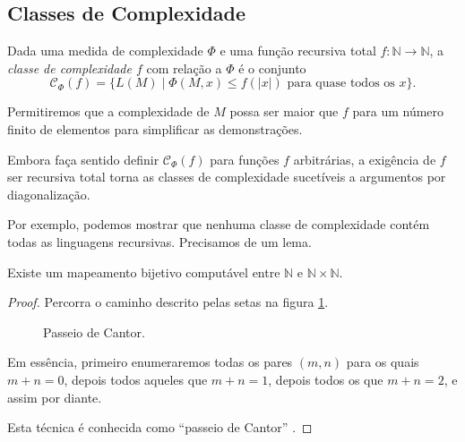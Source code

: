 \subsection{Classes de Complexidade}

\begin{definition}
    Dada uma medida de complexidade $\Phi$
    e uma função recursiva total
    $f: \mathbb N \rightarrow \mathbb N$,
    a \emph{classe de complexidade $f$} com relação a $\Phi$
    é o conjunto
    \begin{equation*}
        \mathcal C_\Phi(f) = \{ L(M) \mid \Phi(M, x) \leq f(|x|)
            \text{ para quase todos os $x$}
        \}.
    \end{equation*}
\end{definition}
Permitiremos que a complexidade de $M$
possa ser maior que $f$ para um número finito de elementos
para simplificar as demonstrações.

Embora faça sentido definir $\mathcal C_\Phi(f)$
para funções $f$ arbitrárias,
a exigência de $f$ ser recursiva total
torna as classes de complexidade
sucetíveis a argumentos por diagonalização.

Por exemplo,
podemos mostrar que
nenhuma classe de complexidade contém todas as linguagens recursivas.
Precisamos de um lema.

\begin{lemma}
    Existe um mapeamento bijetivo computável
    entre $\mathbb N$ e $\mathbb N \times \mathbb N$.
\end{lemma}

\begin{proof}
    Percorra o caminho descrito pelas setas na figura
    \ref{passeio_cantor}.

    \begin{figure}[h]
        \centering
        \caption{Passeio de Cantor.}
        \label{passeio_cantor}
    \end{figure}

    Em essência, primeiro enumeraremos todas os pares $(m, n)$
    para os quais $m + n = 0$,
    depois todos aqueles que $m + n = 1$,
    depois todos os que $m + n = 2$,
    e assim por diante.

    Esta técnica é conhecida como ``passeio de Cantor''
    \cite[p.~6]{CarnielliConiglioBianconi2006}.
\end{proof}

